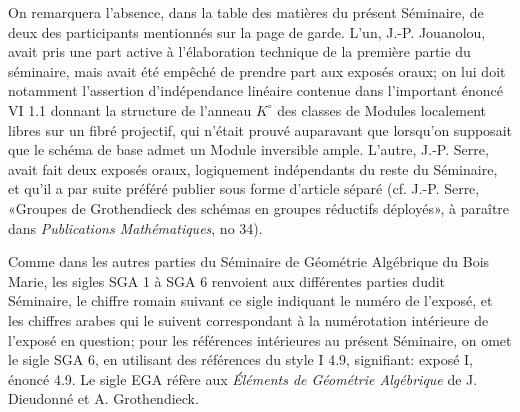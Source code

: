 \documentclass[11pt]{article}
\begin{document}
On remarquera l'absence, dans la table des matières du présent Séminaire, de deux des participants mentionnés sur la page de garde. L'un, J.-P. Jouanolou, avait pris une part active à l'élaboration technique de la première partie du séminaire, mais avait été empêché de prendre part aux exposés oraux; on lui doit notamment l'assertion d'indépendance linéaire contenue dans l'important énoncé VI 1.1 donnant la structure de l'anneau $K^\circ$ des classes de Modules localement libres sur un fibré projectif, qui n'était prouvé auparavant que lorsqu'on supposait que le schéma de base admet un Module inversible ample. L'autre, J.-P. Serre, avait fait deux exposés oraux, logiquement indépendants du reste du Séminaire, et qu'il a par suite préféré publier sous forme d'article séparé (cf. J.-P. Serre, «Groupes de Grothendieck des schémas en groupes réductifs déployés», à paraître dans \emph{Publications Mathématiques}, no 34).

Comme dans les autres parties du Séminaire de Géométrie Algébrique du Bois Marie, les sigles SGA 1 à SGA 6 renvoient aux différentes parties dudit Séminaire, le chiffre romain suivant ce sigle indiquant le numéro de l'exposé, et les chiffres arabes qui le suivent correspondant à la numérotation intérieure de l'exposé en question; pour les références intérieures au présent Séminaire, on omet le sigle SGA 6, en utilisant des références du style I 4.9, signifiant: exposé I, énoncé 4.9. Le sigle EGA réfère aux \emph{Éléments de Géométrie Algébrique} de J. Dieudonné et A. Grothendieck.
\end{document}
